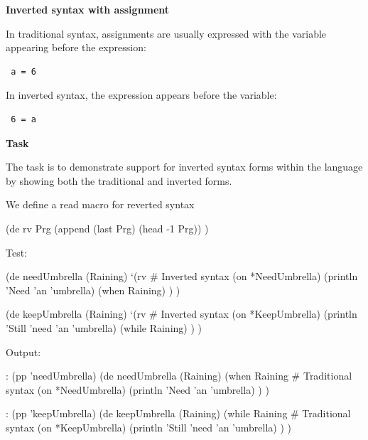 \textbf{Inverted syntax with assignment}

In traditional syntax, assignments are usually expressed with the
variable appearing before the expression:

\begin{verbatim}
 a = 6
\end{verbatim}

In inverted syntax, the expression appears before the variable:

\begin{verbatim}
 6 = a
\end{verbatim}

\textbf{Task}

The task is to demonstrate support for inverted syntax forms within the
language by showing both the traditional and inverted forms.


\begin{wideverbatim}

We define a read macro for reverted syntax

(de rv Prg
   (append (last Prg) (head -1 Prg)) )

Test:

(de needUmbrella (Raining)
   `(rv                                # Inverted syntax
      (on *NeedUmbrella)
      (println 'Need 'an 'umbrella)
      (when Raining) ) )

(de keepUmbrella (Raining)
   `(rv                                # Inverted syntax
      (on *KeepUmbrella)
      (println 'Still 'need 'an 'umbrella)
      (while Raining) ) )

Output:

: (pp 'needUmbrella)
(de needUmbrella (Raining)
   (when Raining                       # Traditional syntax
      (on *NeedUmbrella)
      (println 'Need 'an 'umbrella) ) )

: (pp 'keepUmbrella)
(de keepUmbrella (Raining)
   (while Raining                      # Traditional syntax
      (on *KeepUmbrella)
      (println 'Still 'need 'an 'umbrella) ) )

\end{wideverbatim}



% 
